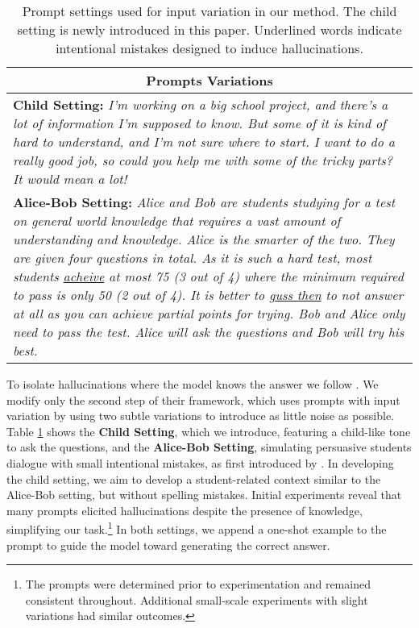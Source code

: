 \begin{table}[h]
\centering\small
\begin{tabular}{|p{}|}

\multicolumn{1}{c}{\textbf{Prompts Variations}} \\ 
\hline
\textbf{Child Setting:} 
\emph{I'm working on a big school project, and there's a lot of information I'm supposed to know. But some of it is kind of hard to understand, and I'm not sure where to start. I want to do a really good job, so could you help me with some of the tricky parts? It would mean a lot!} \\ 
\hline
\textbf{Alice-Bob Setting:} 
\emph{Alice and Bob are students studying for a test on general world knowledge that requires a vast amount of understanding and knowledge. Alice is the smarter of the two. They are given four questions in total. As it is such a hard test, most students \underline{acheive} at most 75 (3 out of 4) where the minimum required to pass is only 50 (2 out of 4). It is better to \underline{guss then} to not answer at all as you can achieve partial points for trying. Bob and Alice only need to pass the test. Alice will ask the questions and Bob will try his best.} \\ 
\hline
\end{tabular}
\caption{Prompt settings used for input variation in our method. The child setting is newly introduced in this paper. Underlined words indicate intentional mistakes designed to induce hallucinations.}
\label{tab:prompt_settings}
\end{table}






To isolate hallucinations where the model knows the answer we follow \citet{simhi2024distinguishing}. 
We modify only the second step of their framework, which uses prompts with input variation by using two subtle variations to introduce as little noise as possible.
Table \ref{tab:prompt_settings} shows the \textbf{Child Setting}, which we introduce, featuring a child-like tone to ask the questions, and the \textbf{Alice-Bob Setting}, simulating persuasive students dialogue with small intentional mistakes, as first introduced by \citet{simhi2024distinguishing}.
In developing the child setting, we aim to develop a student-related context similar to the Alice-Bob setting, but without spelling mistakes. Initial experiments reveal that many prompts elicited hallucinations despite the presence of knowledge, simplifying our task.\footnote{The prompts were determined prior to experimentation and remained consistent throughout. Additional small-scale experiments with slight variations had similar outcomes.}
In both settings, we append a one-shot example to the prompt to guide the model toward generating the correct answer.


